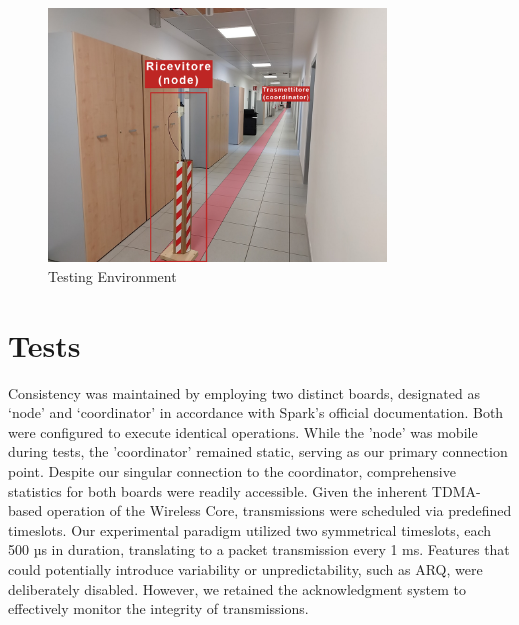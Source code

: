 \begin{figure}[h]
\centering
\includegraphics[width=0.8\textwidth]{images/setup test.png}
\caption{Testing Environment}
\label{fig:testing_environment}
\end{figure}

\section{Tests}
Consistency was maintained by employing two distinct boards, designated as ‘node’ and ‘coordinator’ in accordance with Spark's official documentation. Both were configured to execute identical operations. While the 'node' was mobile during tests, the 'coordinator' remained static, serving as our primary connection point. Despite our singular connection to the coordinator, comprehensive statistics for both boards were readily accessible. Given the inherent TDMA-based operation of the Wireless Core, transmissions were scheduled via predefined timeslots. Our experimental paradigm utilized two symmetrical timeslots, each 500 µs in duration, translating to a packet transmission every 1 ms. Features that could potentially introduce variability or unpredictability, such as ARQ, were deliberately disabled. However, we retained the acknowledgment system to effectively monitor the integrity of transmissions.

